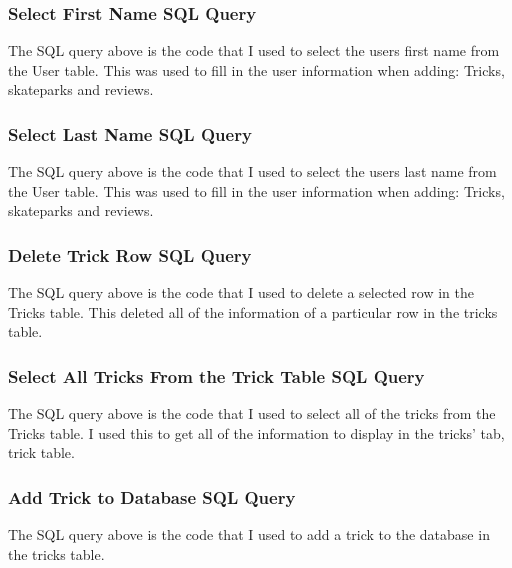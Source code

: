\begin{landscape}
\subsubsection{Select First Name SQL Query}

The SQL query above is the code that I used to select the users first name from the User table. This was used to fill in the user information when adding: Tricks, skateparks and reviews.

\subsubsection{Select Last Name SQL Query}

The SQL query above is the code that I used to select the users last name from the User table. This was used to fill in the user information when adding: Tricks, skateparks and reviews.



\subsubsection{Delete Trick Row SQL Query}

The SQL query above is the code that I used to delete a selected row in the Tricks table. This deleted all of the information of a particular row in the tricks table.


\subsubsection{Select All Tricks From the Trick Table SQL Query}

The SQL query above is the code that I used to select all of the tricks from the Tricks table. I used this to get all of the information to display in the tricks' tab, trick table.

\subsubsection{Add Trick to Database SQL Query}

The SQL query above is the code that I used to add a trick to the database in the tricks table. 




\end{landscape}
